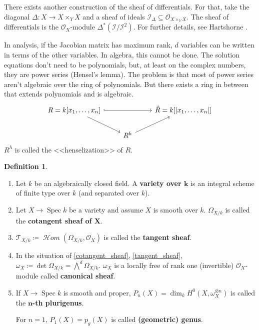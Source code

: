 \documentclass[12pt]{article}
\DeclareMathOperator{\Spec}{Spec}
\DeclareMathOperator{\shHom}{\mathcal{H}\textit{om}}
\theoremstyle{definition}
\newtheorem*{definition}{Definition}
\begin{document}
There exists another construction of the sheaf of differentials. For that, take the diagonal $\Delta:X\rightarrow X\times_YX$ and a sheaf of ideals $\mathcal{I}_{\Delta}\subseteq\mathcal{O}_{X\times_YX}$. The sheaf of differentials is the $\mathcal{O}_X$-module $\Delta^*(\mathcal{I}/\mathcal{I}^2)$. For further details, see Hartshorne \cite{hartshorne2013algebraic}.

In analysis, if the Jacobian matrix has maximum rank, $d$ variables can be written in terms of the other variables. In algebra, this cannot be done. The solution equations don't need to be polynomials, but, at least on the complex numbers, they are power series (Hensel's lemma). The problem is that most of power series aren't algebraic over the ring of polynomials. But there exists a ring in between that extends polynomials and is algebraic.
\[
\begin{tikzcd}
R=k[x_1,\ldots,x_n]\arrow[rr,hook]\arrow[rd]&&\hat{R}=k[|x_1,\ldots,x_n|]\\
&R^h\arrow[ru]
\end{tikzcd}
\]
$R^h$ is called the <<henselization>> of $R$.

\begin{definition}
\begin{enumerate}[label=\arabic*)]
\item Let $k$ be an algebraically closed field. A \textbf{variety over $\boldsymbol{k}$} is an integral scheme of finite type over $k$ (and separated over $k$).

\item\label{cotangent_sheaf} Let $X\rightarrow\Spec k$ be a variety and assume $X$ is smooth over $k$. $\Omega_{X/k}$ is called the \textbf{cotangent sheaf of $\boldsymbol{X}$}.

\item\label{tangent_sheaf} $\mathcal{T}_{X/k}\coloneqq\shHom(\Omega_{X/k},\mathcal{O}_X)$ is called the \textbf{tangent sheaf}.

\item In the situation of \ref{cotangent_sheaf}, \ref{tangent_sheaf}, $\omega_X\coloneqq\det\Omega_{X/k}={\bigwedge}^d\Omega_{X/k}$. $\omega_X$ is a locally free of rank one (invertible) $\mathcal{O}_X$-module called \textbf{canonical sheaf}.

\item If $X\rightarrow\Spec k$ is smooth and proper, $P_n(X)=\dim_kH^0(X,\omega_X^{\otimes n})$ is called the \textbf{$\boldsymbol{n}$-th plurigenus}.

For $n=1$, $P_1(X)=p_g(X)$ is called \textbf{(geometric) genus}.
\end{enumerate}
\end{definition}
\end{document}
